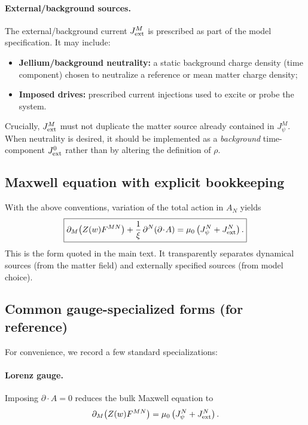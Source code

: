 \documentclass[11pt]{article}
\begin{document}
\paragraph{External/background sources.}
The external/background current $J_{\rm ext}^M$ is prescribed as part of the model specification. It may include:
\begin{itemize}[leftmargin=2.0em]
\item \textbf{Jellium/background neutrality:} a static background charge density (time component) chosen to neutralize a reference or mean matter charge density;
\item \textbf{Imposed drives:} prescribed current injections used to excite or probe the system.
\end{itemize}
Crucially, $J_{\rm ext}^M$ must not duplicate the matter source already contained in $J_\psi^M$. When neutrality is desired, it should be implemented as a \emph{background} time-component $J_{\rm ext}^0$ rather than by altering the definition of $\rho$.

\subsection{Maxwell equation with explicit bookkeeping}
\label{app:maxwell-bookkeeping}

With the above conventions, variation of the total action in $A_N$ yields
\begin{equation}
\boxed{
\partial_M\!\left(Z(w)F^{MN}\right)
+\frac{1}{\xi}\,\partial^N(\partial\!\cdot\!A)
=\mu_0\left(J_\psi^N+J_{\rm ext}^N\right).
}
\end{equation}
This is the form quoted in the main text. It transparently separates dynamical sources (from the matter field) and externally specified sources (from model choice).

\subsection{Common gauge-specialized forms (for reference)}
\label{app:gauge-special}

For convenience, we record a few standard specializations:

\paragraph{Lorenz gauge.}
Imposing $\partial\!\cdot\!A=0$ reduces the bulk Maxwell equation to
\begin{equation}
\partial_M\!\left(Z(w)F^{MN}\right)=\mu_0\left(J_\psi^N+J_{\rm ext}^N\right).
\end{equation}
\end{document}
